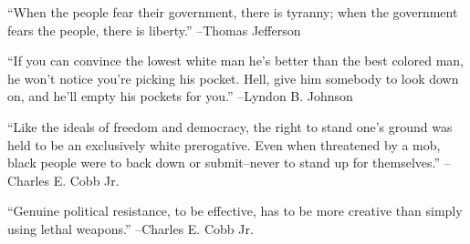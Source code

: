 \documentclass{article}%
\begin{document}
\vspace{1mm}%
\begin{minipage}{\textwidth}%
\flushleft%
“When the people fear their government, there is tyranny; when the government fears the people, there is liberty.”%
\linebreak%
\vspace{1mm}%
–Thomas Jefferson%
\linebreak%
\vspace{1mm}%
\end{minipage}%
\linebreak%
\vspace{1mm}%
\begin{minipage}{\textwidth}%
\flushleft%
“If you can convince the lowest white man he's better than the best colored man, he won't notice you're picking his pocket. Hell, give him somebody to look down on, and he'll empty his pockets for you.”%
\linebreak%
\vspace{1mm}%
–Lyndon B. Johnson%
\linebreak%
\vspace{1mm}%
\end{minipage}%
\linebreak%
\vspace{1mm}%
\begin{minipage}{\textwidth}%
\flushleft%
“Like the ideals of freedom and democracy, the right to stand one's ground was held to be an exclusively white prerogative. Even when threatened by a mob, black people were to back down or submit–never to stand up for themselves.”%
\linebreak%
\vspace{1mm}%
–Charles E. Cobb Jr.%
\linebreak%
\vspace{1mm}%
\end{minipage}%
\linebreak%
\vspace{1mm}%
\begin{minipage}{\textwidth}%
\flushleft%
“Genuine political resistance, to be effective, has to be more creative than simply using lethal weapons.”%
\linebreak%
\vspace{1mm}%
–Charles E. Cobb Jr.%
\linebreak%
\vspace{1mm}%
\end{minipage}%
\linebreak%
\vspace{1mm}%
\end{document}
